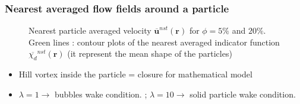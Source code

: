 \documentclass{sintefbeamer}
\newcommand{\nstavg}[1]{\overline{#1}^{nst}}
\begin{document}
\begin{frame}
  \frametitle{Nearest averaged flow fields around a particle}
\begin{figure}[h!]
  \centering
  \caption{Nearest particle averaged velocity $\nstavg{\textbf{u}}(\textbf{r})$ for  $\phi = 5\%$ and $20\%$.
  Green lines : contour plots of the nearest averaged indicator function $\nstavg{\chi_d}(\textbf{r})$ (it represent the mean shape of the particles)}
  \label{fig:Stream}
\end{figure}

\begin{itemize}
  \item Hill vortex inside the particle = closure for mathematical model
  \item $\lambda = 1 \rightarrow$ bubbles wake condition.
  ; $\lambda = 10 \rightarrow$ solid particle wake condition. 
\end{itemize}
\end{frame}
\end{document}
